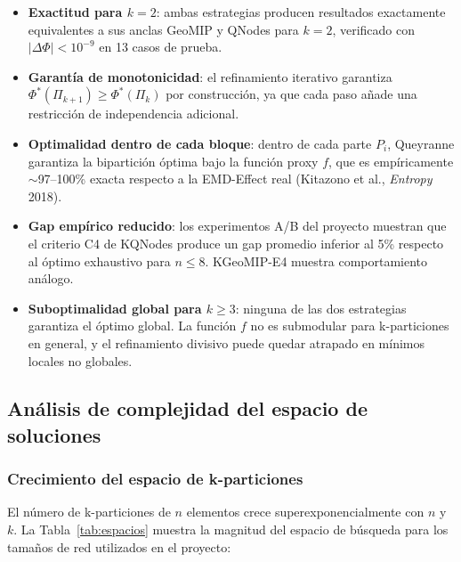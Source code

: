 \begin{itemize}
  \item \textbf{Exactitud para $k=2$}: ambas estrategias producen resultados exactamente
        equivalentes a sus anclas GeoMIP y QNodes para $k=2$, verificado con
        $|\Delta\Phi| < 10^{-9}$ en 13 casos de prueba.

  \item \textbf{Garantía de monotonicidad}: el refinamiento iterativo garantiza
        $\Phi^*(\Pi_{k+1}) \geq \Phi^*(\Pi_k)$ por construcción, ya que cada paso añade
        una restricción de independencia adicional.

  \item \textbf{Optimalidad dentro de cada bloque}: dentro de cada parte $P_i$, Queyranne
        garantiza la bipartición óptima bajo la función proxy $f$, que es empíricamente
        $\sim$97--100\% exacta respecto a la EMD-Effect real (Kitazono et al., \textit{Entropy}
        2018).

  \item \textbf{Gap empírico reducido}: los experimentos A/B del proyecto muestran que el
        criterio C4 de KQNodes produce un gap promedio inferior al 5\% respecto al óptimo
        exhaustivo para $n \leq 8$. KGeoMIP-E4 muestra comportamiento análogo.

  \item \textbf{Suboptimalidad global para $k \geq 3$}: ninguna de las dos estrategias garantiza
        el óptimo global. La función $f$ no es submodular para k-particiones en general, y el
        refinamiento divisivo puede quedar atrapado en mínimos locales no globales.
\end{itemize}

\subsection{Análisis de complejidad del espacio de soluciones}

\subsubsection*{Crecimiento del espacio de k-particiones}

El número de k-particiones de $n$ elementos crece superexponencialmente con $n$ y $k$.
La Tabla~\ref{tab:espacios} muestra la magnitud del espacio de búsqueda para los tamaños
de red utilizados en el proyecto:

